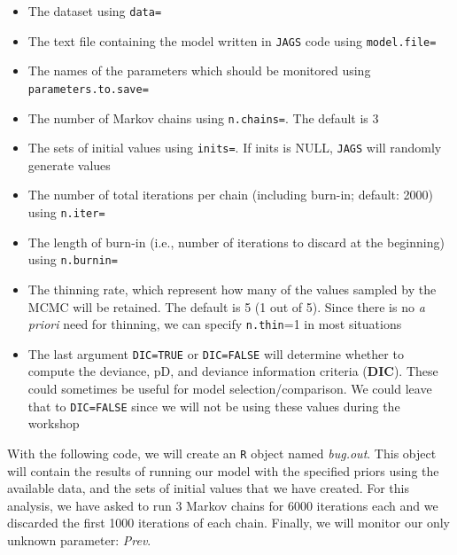 \documentclass[
]{book}
\providecommand{\tightlist}{%
  \setlength{\itemsep}{0pt}\setlength{\parskip}{0pt}}
\begin{document}
\begin{itemize}
\tightlist
\item
  The dataset using \texttt{data=}\\
\item
  The text file containing the model written in \texttt{JAGS} code using \texttt{model.file=}\\
\item
  The names of the parameters which should be monitored using \texttt{parameters.to.save=}\\
\item
  The number of Markov chains using \texttt{n.chains=}. The default is 3\\
\item
  The sets of initial values using \texttt{inits=}. If inits is NULL, \texttt{JAGS} will randomly generate values\\
\item
  The number of total iterations per chain (including burn-in; default: 2000) using \texttt{n.iter=}
\item
  The length of burn-in (i.e., number of iterations to discard at the beginning) using \texttt{n.burnin=}
\item
  The thinning rate, which represent how many of the values sampled by the MCMC will be retained. The default is 5 (1 out of 5). Since there is no \emph{a priori} need for thinning, we can specify \texttt{n.thin}=1 in most situations
\item
  The last argument \texttt{DIC=TRUE} or \texttt{DIC=FALSE} will determine whether to compute the deviance, pD, and deviance information criteria (\textbf{DIC}). These could sometimes be useful for model selection/comparison. We could leave that to \texttt{DIC=FALSE} since we will not be using these values during the workshop
\end{itemize}

With the following code, we will create an \texttt{R} object named \emph{bug.out}. This object will contain the results of running our model with the specified priors using the available data, and the sets of initial values that we have created. For this analysis, we have asked to run 3 Markov chains for 6000 iterations each and we discarded the first 1000 iterations of each chain. Finally, we will monitor our only unknown parameter: \emph{Prev}.
\end{document}
